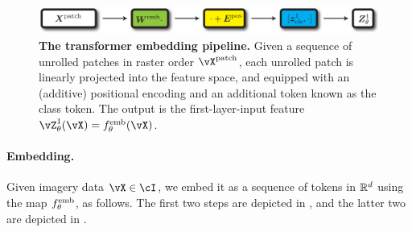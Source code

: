 \documentclass[../../book-main.tex]{subfiles}
\begin{document}
\begin{figure}
    \centering 
    \includegraphics[width=\textwidth]{chapters/chapter7/figs/transformer_embedding.pdf}
    \caption{\small\textbf{The transformer embedding pipeline.} Given a sequence of unrolled patches in raster order \(\vX^{\patch}\), each unrolled patch is linearly projected into the feature space, and equipped with an (additive) positional encoding and an additional token known as the class token. The output is the first-layer-input feature \(\vZ_{\theta}^{1}(\vX) = f_{\theta}^{\emb}(\vX)\).}
    \label{fig:transformer_embedding}
\end{figure}

\paragraph{Embedding.} Given imagery data \(\vX \in \cI\), we embed it as a sequence of tokens in \(\mathbb{R}^{d}\) using the map \(f_{\theta}^{\mathrm{emb}}\), as follows. The first two steps are depicted in , and the latter two are depicted in .
\end{document}
